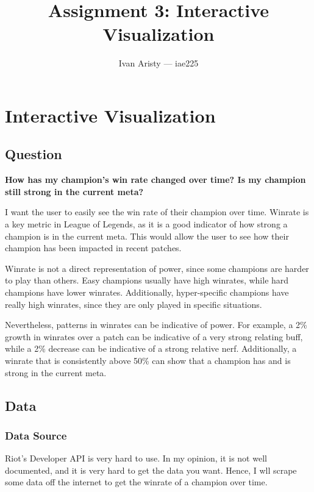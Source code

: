 \documentclass{article}
\title{Assignment 3: Interactive Visualization}
\author{Ivan Aristy — iae225}
\begin{document}
  \maketitle %
  \thispagestyle{empty}

\section{Interactive Visualization}
\label{sec:sec1}

\subsection{Question }
\label{subsec:subsec1}

\textbf{How has my champion's win rate changed over time? Is my champion still strong in the current meta?}

I want the user to easily see the win rate of their champion over time. 
Winrate is a key metric in League of Legends, as it is a good indicator of how strong a champion is in the current meta.
This would allow the user to see how their champion has been impacted in recent patches.

Winrate is not a direct representation of power, since some champions are harder to play than others.
Easy champions usually have high winrates, while hard champions have lower winrates.
Additionally, hyper-specific champions have really high winrates, since they are only played in specific situations.

Nevertheless, patterns in winrates can be indicative of power. For example, a 2\% growth in winrates
over a patch can be indicative of a very strong relating buff, while a 2\% decrease can be indicative of a strong relative nerf.
Additionally, a winrate that is consistently above 50\% can show that a champion has and is strong in the current meta.

\subsection{Data}
\label{subsec:subsec2}

\subsubsection{Data Source}
\label{subsubsec:Data Source}

Riot's Developer API is very hard to use. In my opinion, it is not well documented, and it is very hard to get the data you want.
Hence, I wll scrape some data off the internet to get the winrate of a champion over time.
\end{document}

